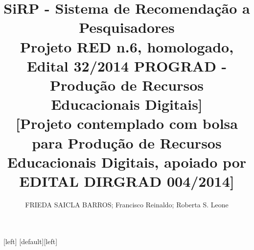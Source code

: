 \documentclass{beamer}
\begin{document}
\setlength{\paperwidth}{90cm} %
\setlength{\paperheight}{120cm} %
\newlength{\sepmargin}
\newlength{\sepwid}
\newlength{\onecolwid}
\newlength{\twocolwid}
\newlength{\threecolwid}

\setlength{\sepmargin}{0.055\paperwidth} %
\setlength{\sepwid}{0.03\paperwidth} %
\setlength{\onecolwid}{0.425\paperwidth} %




[left]
[default][left]

\title{SiRP - Sistema de Recomendação a Pesquisadores\\\small{Projeto  RED n.6, homologado, Edital 32/2014 PROGRAD - Produção de Recursos Educacionais Digitais]}\\
\small{[Projeto contemplado com bolsa para Produção de Recursos Educacionais Digitais, apoiado por EDITAL DIRGRAD 004/2014] 
}}

\author{FRIEDA SAICLA BARROS; Francisco Reinaldo; Roberta S. Leone} %


\usepackage[absolute,overlay]{textpos}
  \setlength{\TPHorizModule}{1mm}
  \setlength{\TPVertModule}{1mm}
  
\end{document}
